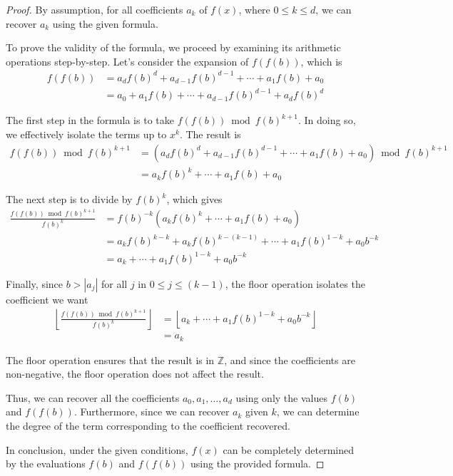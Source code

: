 \documentclass[12pt,reqno]{article}
\theoremstyle{plain}
\theoremstyle{definition}
\newcommand{\floor}[1]{\left\lfloor #1 \right\rfloor}
\begin{document}
\begin{proof}
By assumption, for all coefficients $a_k$ of $f(x)$, where $0 \leq k \leq d$, we can recover $a_k$ using the given formula.

To prove the validity of the formula, we proceed by examining its arithmetic operations step-by-step. Let's consider the expansion of $f(f(b))$, which is
\begin{align*}
f(f(b)) &= a_d f(b)^d + a_{d-1} f(b)^{d-1} + \cdots + a_1 f(b) + a_0 \\
&= a_0 + a_1 f(b) + \cdots + a_{d-1} f(b)^{d-1} + a_d f(b)^d
\end{align*}

The first step in the formula is to take $f(f(b)) \bmod{f(b)^{k + 1}}$. In doing so, we effectively isolate the terms up to $x^k$. The result is
\begin{align*}
f(f(b)) \bmod{f(b)^{k + 1}} &= (a_d f(b)^d + a_{d-1} f(b)^{d-1} + \cdots + a_1 f(b) + a_0) \bmod{f(b)^{k + 1}} \\
&= a_k f(b)^k + \cdots + a_1 f(b) + a_0 
\end{align*}

The next step is to divide by $f(b)^k$, which gives
\begin{align*}
\frac{f(f(b))  \bmod{f(b)^{k + 1}}}{f(b)^{k}} &= f(b)^{-k} (a_k f(b)^k + \cdots + a_1 f(b) + a_0) \\
&= a_k f(b)^{k-k} + a_k f(b)^{k-(k-1)} + \cdots + a_1 f(b)^{1-k} + a_0 b^{-k} \\
&= a_k + \cdots + a_1 f(b)^{1-k} + a_0 b^{-k}
\end{align*}

Finally, since $b > |a_j|$ for all $j$ in $0 \leq j \leq (k-1)$, the floor operation isolates the coefficient we want
\begin{align*}
\floor{\frac{f(f(b)) \bmod{f(b)^{k + 1}}}{f(b)^{k}}}
&= \floor{a_k + \cdots + a_1 f(b)^{1-k} + a_0 b^{-k}} \\
&= a_k
\end{align*}

The floor operation ensures that the result is in $\mathbb{Z}$, and since the coefficients are non-negative, the floor operation does not affect the result.

Thus, we can recover all the coefficients $a_0, a_1, \ldots, a_d$ using only the values $f(b)$ and $f(f(b))$. Furthermore, since we can recover $a_k$ given $k$, we can determine the degree of the term corresponding to the coefficient recovered.

In conclusion, under the given conditions, $f(x)$ can be completely determined by the evaluations $f(b)$ and $f(f(b))$ using the provided formula.
\end{proof}
\end{document}
